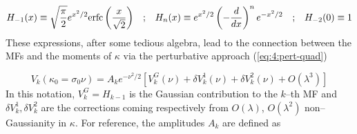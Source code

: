 \begin{equation}
\label{eq:4:hermite}
\begin{matrix}
\displaystyle H_{-1}(x) \equiv \sqrt{\frac{\pi}{2}}e^{x^2/2}{\rm erfc}\left(\frac{x}{\sqrt{2}}\right) & ; & \displaystyle H_n(x) \equiv e^{x^2/2}\left(-\frac{d}{dx}\right)^n e^{-x^2/2} & ; & H_{-2}(0)\equiv 1 
\end{matrix}
\end{equation}
%
These expressions, after some tedious algebra, lead to the connection between the MFs and the moments of $\kappa$ via the perturbative approach (\ref{eq:4:pert-quad})

\begin{equation}
\label{eq:4:Vk-pert}
V_k(\kappa_0=\sigma_0\nu) = A_k e^{-\nu^2/2}\left[V_k^G(\nu)+\delta V^1_k(\nu) + \delta V^2_k(\nu) + O(\lambda^3)\right] 
\end{equation}
%
In this notation, $V_k^G=H_{k-1}$ is the Gaussian contribution to the $k$--th MF and $\delta V^1_k,\delta V^2_k$ are the corrections coming respectively from $O(\lambda)$, $O(\lambda^2)$ non--Gaussianity in $\kappa$. For reference, the amplitudes $A_k$ are defined as 

